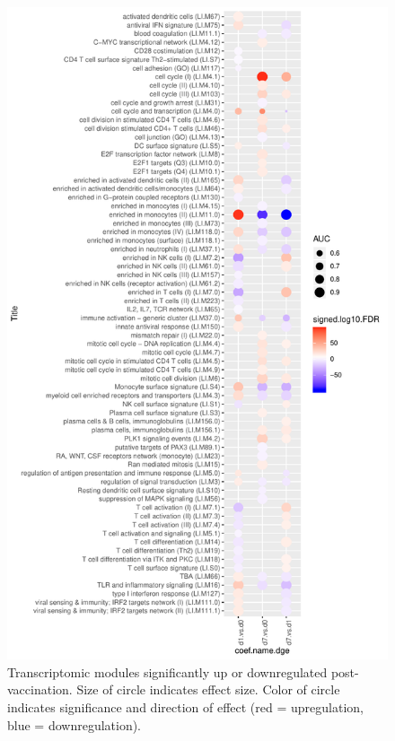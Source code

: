 \begin{figure}
    \includegraphics[width=1.0\textwidth]{mainmatter/figures/chapter_02/compare_dge_eqtl.tmodDotPlot.DGE.timepoint.pdf}
    \caption{Transcriptomic modules significantly up or downregulated post-vaccination. Size of circle indicates effect size. Color of circle indicates significance and direction of effect (red = upregulation, blue = downregulation).}
    \label{fig:hird_tmodDotPlot_timepoint}
\end{figure}

